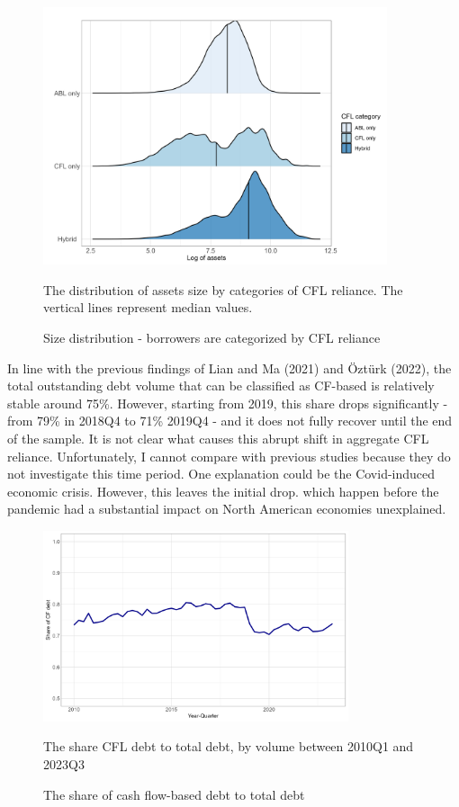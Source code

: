 \documentclass[12pt]{article}
\begin{document}
\begin{figure}[H]  %
    \centering
    \caption{Size distribution - borrowers are categorized by CFL reliance}\label{chart:ridges}
    \includegraphics[width=0.9\textwidth]{ridges.png} 
    
     \small The distribution of assets size by categories of CFL reliance. The vertical lines represent median values. 
\end{figure}

\noindent In line with the previous findings of Lian and Ma (2021) and Öztürk (2022), the total outstanding debt volume that can be classified as CF-based is relatively stable around 75\%. However, starting from 2019, this share drops significantly - from 79\% in 2018Q4 to 71\% 2019Q4 - and it does not fully recover until the end of the sample. It is not clear what causes this abrupt shift in aggregate CFL reliance. Unfortunately, I cannot compare with previous studies because they do not investigate this time period. One explanation could be the Covid-induced economic crisis. However, this leaves the initial drop. which happen before the pandemic had a substantial impact on North American economies unexplained. 

\begin{figure}[H]  %
    \centering
    \caption{The share of cash flow-based debt to total debt} \label{chart:CFLshare}
    \includegraphics[width=0.8\textwidth]{CFshare.png}
    
     \small The share CFL debt to total debt, by volume between 2010Q1 and 2023Q3
\end{figure}
\end{document}
